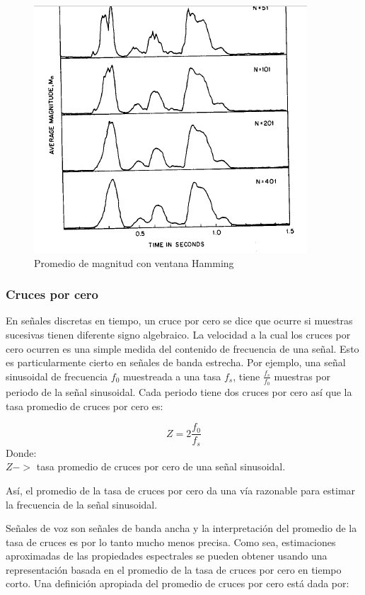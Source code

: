 \begin{figure}[H]
	\centering
	\includegraphics[width=0.5\linewidth]{figures/promedioHamming}
	\caption{Promedio de magnitud con ventana Hamming}
	\label{fig:promedioHamming}
\end{figure}

\subsubsection{Cruces por cero}

En señales discretas en tiempo, un cruce por cero se dice que ocurre si muestras sucesivas tienen diferente signo algebraico. La velocidad a la cual los cruces por cero ocurren es una simple medida del contenido de frecuencia de una señal. Esto es particularmente cierto en señales de banda estrecha. Por ejemplo, una señal sinusoidal de frecuencia $f_0$ muestreada a una tasa $f_s$, tiene $\frac{f_s}{f_0}$  muestras por periodo de la señal sinusoidal. Cada periodo tiene dos cruces por cero así que la tasa promedio de cruces por cero es:

\begin{equation}\label{eq:promedio}
	Z=2\frac{f_0}{f_s}
\end{equation}
Donde:
\\$Z->$ tasa promedio de cruces por cero de una señal sinusoidal.

Así, el promedio de la tasa de cruces por cero da una vía razonable para estimar la frecuencia de la señal sinusoidal.

Señales de voz son señales de banda ancha y la interpretación del promedio de la tasa de cruces es por lo tanto mucho menos precisa. Como sea, estimaciones aproximadas de las propiedades espectrales se pueden obtener usando una representación basada en el promedio de la tasa de cruces por cero en tiempo corto. Una definición apropiada del promedio de cruces por cero está dada por:


